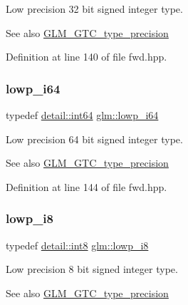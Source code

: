 Low precision 32 bit signed integer type. \begin{DoxySeeAlso}{See also}
\mbox{\hyperlink{group__gtc__type__precision}{G\+L\+M\+\_\+\+G\+T\+C\+\_\+type\+\_\+precision}} 
\end{DoxySeeAlso}


Definition at line 140 of file fwd.\+hpp.

\mbox{\label{group__gtc__type__precision_ga1f4ded25f71c0f3b4518936d50b54b6e}} 
\subsubsection{\texorpdfstring{lowp\_i64}{lowp\_i64}}
{\footnotesize\ttfamily typedef \mbox{\hyperlink{namespaceglm_1_1detail_a5b1c3227ec636c24a0676746381adfc8}{detail\+::int64}} \mbox{\hyperlink{group__gtc__type__precision_ga1f4ded25f71c0f3b4518936d50b54b6e}{glm\+::lowp\+\_\+i64}}}

Low precision 64 bit signed integer type. \begin{DoxySeeAlso}{See also}
\mbox{\hyperlink{group__gtc__type__precision}{G\+L\+M\+\_\+\+G\+T\+C\+\_\+type\+\_\+precision}} 
\end{DoxySeeAlso}


Definition at line 144 of file fwd.\+hpp.

\mbox{\label{group__gtc__type__precision_gaa2e13ee29c90f75658beed6082541097}} 
\subsubsection{\texorpdfstring{lowp\_i8}{lowp\_i8}}
{\footnotesize\ttfamily typedef \mbox{\hyperlink{namespaceglm_1_1detail_a04b526a8d7a9b455602a0afa78c531e0}{detail\+::int8}} \mbox{\hyperlink{group__gtc__type__precision_gaa2e13ee29c90f75658beed6082541097}{glm\+::lowp\+\_\+i8}}}

Low precision 8 bit signed integer type. \begin{DoxySeeAlso}{See also}
\mbox{\hyperlink{group__gtc__type__precision}{G\+L\+M\+\_\+\+G\+T\+C\+\_\+type\+\_\+precision}} 
\end{DoxySeeAlso}


